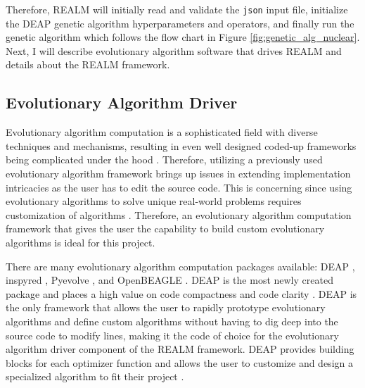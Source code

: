Therefore, \gls{REALM} will initially read and validate the \texttt{json} input 
file, initialize the \gls{DEAP} genetic algorithm hyperparameters and operators, 
and finally run the genetic algorithm which follows the flow chart in Figure 
\ref{fig:genetic_alg_nuclear}. 
Next, I will describe evolutionary algorithm software that drives \gls{REALM} 
and details about the \gls{REALM} framework. 

\subsection{Evolutionary Algorithm Driver}
Evolutionary algorithm computation is a sophisticated field with diverse techniques 
and mechanisms, resulting in even well designed coded-up frameworks being complicated 
under the hood \cite{fortin_deap_2012}. 
Therefore, utilizing a previously used evolutionary algorithm framework brings 
up issues in extending implementation intricacies as the user has to edit the 
source code. 
This is concerning since using evolutionary algorithms to solve unique real-world 
problems requires customization of algorithms \cite{fortin_deap_2012}. 
Therefore, an evolutionary algorithm computation framework that gives the user the 
capability to build custom evolutionary algorithms is ideal for this project.

There are many evolutionary algorithm computation packages available: 
\gls{DEAP} \cite{fortin_deap_2012}, inspyred \cite{garrett_inspyred_2014}, 
Pyevolve \cite{perone_pyevolve_2009}, and OpenBEAGLE \cite{gagne_open_2002}.
\gls{DEAP} is the most newly created package and places a high value on code 
compactness and code clarity \cite{fortin_deap_2012}. 
\gls{DEAP} is the only framework that allows the user to rapidly prototype 
evolutionary algorithms and define custom algorithms without having to dig 
deep into the source code to modify lines,  making it the code of choice for 
the evolutionary algorithm driver component of the \gls{REALM} framework.  
\gls{DEAP} provides building blocks for each optimizer function and allows the 
user to customize and design a specialized algorithm to fit their project
\cite{fortin_deap_2012}.

